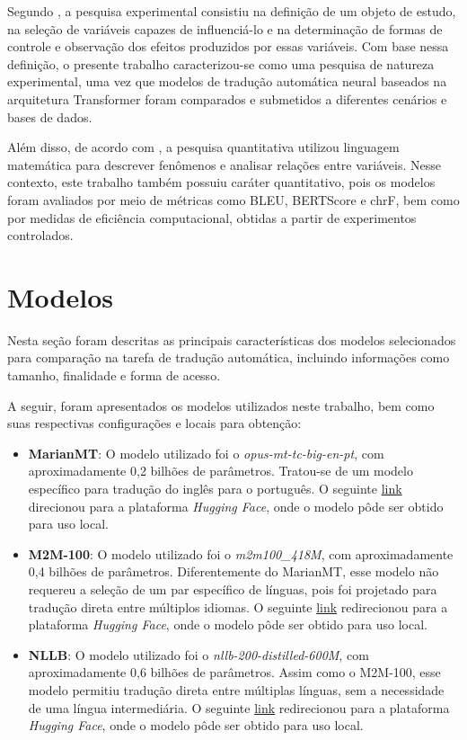 Segundo , a pesquisa experimental consistiu na definição de um objeto de estudo, na seleção de variáveis capazes de influenciá-lo e na determinação de formas de controle e observação dos efeitos produzidos por essas variáveis. Com base nessa definição, o presente trabalho caracterizou-se como uma pesquisa de natureza experimental, uma vez que modelos de tradução automática neural baseados na arquitetura Transformer foram comparados e submetidos a diferentes cenários e bases de dados.

Além disso, de acordo com , a pesquisa quantitativa utilizou linguagem matemática para descrever fenômenos e analisar relações entre variáveis. Nesse contexto, este trabalho também possuiu caráter quantitativo, pois os modelos foram avaliados por meio de métricas como BLEU, BERTScore e chrF, bem como por medidas de eficiência computacional, obtidas a partir de experimentos controlados.


\section{Modelos}

Nesta seção foram descritas as principais características dos modelos selecionados para comparação na tarefa de tradução automática, incluindo informações como tamanho, finalidade e forma de acesso.

A seguir, foram apresentados os modelos utilizados neste trabalho, bem como suas respectivas configurações e locais para obtenção:

\begin{itemize}
    \item \textbf{MarianMT}: O modelo utilizado foi o \textit{opus-mt-tc-big-en-pt}, com aproximadamente 0,2 bilhões de parâmetros. Tratou-se de um modelo específico para tradução do inglês para o português. O seguinte \href{https://huggingface.co/Helsinki-NLP/opus-mt-tc-big-en-pt}{link} direcionou para a plataforma \textit{Hugging Face}, onde o modelo pôde ser obtido para uso local.

    \item \textbf{M2M-100}: O modelo utilizado foi o \textit{m2m100\_418M}, com aproximadamente 0,4 bilhões de parâmetros. Diferentemente do MarianMT, esse modelo não requereu a seleção de um par específico de línguas, pois foi projetado para tradução direta entre múltiplos idiomas. O seguinte \href{https://huggingface.co/facebook/m2m100_418M}{link} redirecionou para a plataforma \textit{Hugging Face}, onde o modelo pôde ser obtido para uso local.

    \item \textbf{NLLB}: O modelo utilizado foi o \textit{nllb-200-distilled-600M}, com aproximadamente 0,6 bilhões de parâmetros. Assim como o M2M-100, esse modelo permitiu tradução direta entre múltiplas línguas, sem a necessidade de uma língua intermediária. O seguinte \href{https://huggingface.co/facebook/nllb-200-distilled-600M}{link} redirecionou para a plataforma \textit{Hugging Face}, onde o modelo pôde ser obtido para uso local.

\end{itemize}

